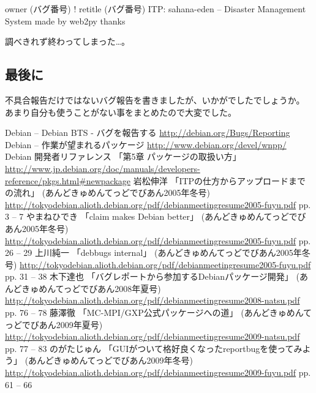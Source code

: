 \documentclass[mingoth,a4paper]{jsarticle}
\begin{document}
\begin{commandline}
owner (バグ番号) !
retitle (バグ番号) ITP: sahana-eden -- Disaster Management System made by web2py
thanks
\end{commandline}

調べきれず終わってしまった…。

\subsection{最後に}
不具合報告だけではないバグ報告を書きましたが、いかがでしたでしょうか。
あまり自分も使うことがない事をまとめたので大変でした。


\begin{thebibliography}{99}
            Debian -- Debian BTS - バグを報告する
            \url{http://debian.org/Bugs/Reporting}
            Debian -- 作業が望まれるパッケージ
            \url{ http://www.debian.org/devel/wnpp/}
            Debian 開発者リファレンス
            「第5章 パッケージの取扱い方」
            \url{http://www.jp.debian.org/doc/manuals/developers-reference/pkgs.html#newpackage}
            岩松伸洋
            「ITPの仕方からアップロードまでの流れ」
            (あんどきゅめんてっどでびあん2005年冬号)
            \url{http://tokyodebian.alioth.debian.org/pdf/debianmeetingresume2005-fuyu.pdf}
            pp. 3 -- 7
            やまねひでき
            「claim makes Debian better」
            (あんどきゅめんてっどでびあん2005年冬号)
            \url{http://tokyodebian.alioth.debian.org/pdf/debianmeetingresume2005-fuyu.pdf}
            pp. 26 -- 29
            上川純一
            「debbugs internal」
            (あんどきゅめんてっどでびあん2005年冬号)
            \url{http://tokyodebian.alioth.debian.org/pdf/debianmeetingresume2005-fuyu.pdf}
            pp. 31 -- 38
            木下達也
            「バグレポートから参加するDebianパッケージ開発」
            (あんどきゅめんてっどでびあん2008年夏号)
            \url{http://tokyodebian.alioth.debian.org/pdf/debianmeetingresume2008-natsu.pdf}
            pp. 76 -- 78
            藤澤徹
            「MC-MPI/GXP公式パッケージへの道」
            (あんどきゅめんてっどでびあん2009年夏号)
            \url{http://tokyodebian.alioth.debian.org/pdf/debianmeetingresume2009-natsu.pdf}
            pp. 77 -- 83
            のがたじゅん
            「GUIがついて格好良くなったreportbugを使ってみよう」
            (あんどきゅめんてっどでびあん2009年冬号)
            \url{http://tokyodebian.alioth.debian.org/pdf/debianmeetingresume2009-fuyu.pdf}
            pp. 61 -- 66
\end{thebibliography}
\end{document}
